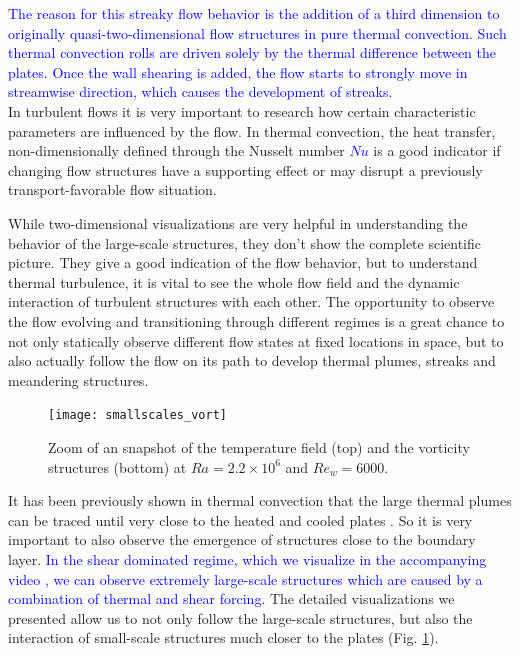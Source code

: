 \documentclass[5p,times]{elsarticle}
\begin{document}
\textcolor{blue}{The reason for this streaky flow behavior is the addition of a third dimension to originally quasi-two-dimensional flow structures in pure thermal convection. Such thermal convection rolls are driven solely by the thermal difference between the plates. Once the wall shearing is added, the flow starts to strongly move in streamwise direction, which causes the development of streaks.} \\

In turbulent flows it is very important to research how certain characteristic
parameters are influenced by the flow. In thermal convection, the heat transfer, non-dimensionally
defined through the Nusselt number \textcolor{blue}{$Nu$} is a good indicator if changing flow structures have a supporting effect or may disrupt a previously transport-favorable flow situation. 




While two-dimensional visualizations are very helpful in understanding the behavior of the large-scale structures, they don't show the complete scientific picture. They give a good indication of the flow behavior, but to understand thermal turbulence, it is vital to see the whole flow field and the dynamic interaction of turbulent structures with each other.
The opportunity to observe the flow evolving and transitioning through different regimes is a great chance to not only statically observe different flow states at fixed locations in space, but to also actually follow the flow on its path to develop thermal plumes, streaks and meandering structures.


\begin{figure}
	\centering
	\texttt{[image: smallscales\_vort]}%
	\caption{\label{fig:smallscale} Zoom of an snapshot of the temperature field (top) and the vorticity structures (bottom) at $ Ra=2.2 \times 10^6 $ and $ Re_w=6000 $.}
\end{figure}

It has been previously shown in thermal convection that the large thermal plumes can be traced until very close to the heated and cooled plates \cite{ste18}. So it is very important to also observe the emergence of structures close to the boundary layer. \textcolor{blue}{In the shear dominated regime, which we visualize in the accompanying video \cite{fav18}, we can observe extremely large-scale structures which are caused by a combination of thermal and shear forcing.} The detailed visualizations we presented allow us to not only follow the large-scale structures, but also the interaction of small-scale structures much closer to the plates (Fig. \ref{fig:smallscale}). \\
\end{document}

